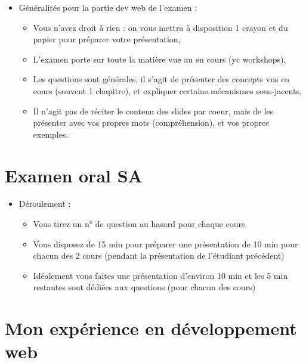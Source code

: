 \begin{itemize}
\tightlist
\item
  Généralités pour la partie dev web de l'examen :

  \begin{itemize}
  \tightlist
  \item
    Vous n'avez droit à rien : on vous mettra à disposition 1 crayon et
    du papier pour préparer votre présentation,
  \item
    L'examen porte sur toute la matière vue au en cours (yc workshops),
  \item
    Les questions sont générales, il s'agit de présenter des concepts
    vus en cours (souvent 1 chapitre), et expliquer certains mécanismes
    sous-jacents,
  \item
    Il n'agit pas de réciter le contenu des slides par coeur, mais de
    les présenter avec vos propres mots (compréhension), et vos propres
    exemples.
  \end{itemize}
\end{itemize}

\hypertarget{examen-oral-sa-1}{%
\section{Examen oral SA}\label{examen-oral-sa-1}}

\begin{itemize}
\tightlist
\item
  Déroulement :

  \begin{itemize}
  \tightlist
  \item
    Vous tirez un n° de question au hasard pour chaque cours
  \item
    Vous disposez de 15 min pour préparer une présentation de 10 min
    pour chacun des 2 cours (pendant la présentation de l'étudiant
    précédent)
  \item
    Idéalement vous faites une présentation d'environ 10 min et les 5
    min restantes sont dédiées aux questions (pour chacun des cours)
  \end{itemize}
\end{itemize}

\hypertarget{mon-expuxe9rience-en-duxe9veloppement-web}{%
\section{Mon expérience en développement
web}\label{mon-expuxe9rience-en-duxe9veloppement-web}}

